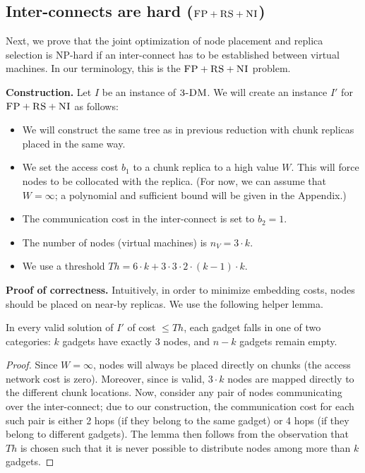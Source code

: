 \documentclass[9pt,twocolumn]{scrartcl}
\newcommand{\CC}{\textsc{NI}}
\newcommand{\FP}{\textsc{FP}}
\newcommand{\RS}{\textsc{RS}}
\newcommand{\CostTrans}{\ensuremath{b_1}}
\newcommand{\CostCom}{\ensuremath{b_2}}
\newcommand{\Vms}{\ensuremath{n_V}}
\newcommand{\TDM}{\textsc{3-DM}}
\newcommand{\Thr}{\ensuremath{Th}}
\begin{document}
\subsection{Inter-connects are hard ($\FP+\RS+\CC$)}\label{ssec:fprscc}

Next, we prove that the joint optimization of node placement and replica selection
is NP-hard if an inter-connect has to be established between virtual machines.
In our terminology, this is the $\FP+\RS+\CC$ problem.

\textbf{Construction.}
Let $I$ be an instance of $\TDM$. We will create an instance $I'$
for $\FP+\RS+\CC$ as follows:
\begin{itemize}
\item We will construct the same tree as in previous reduction with
chunk replicas placed in the same way.
\item We set the access cost $\CostTrans$ to a chunk replica to a high value $W$. This will force
nodes to be collocated with the replica.
(For now, we can assume that $W=\infty$; a polynomial and sufficient bound will be given
in the Appendix.)
\item The communication cost in the inter-connect is set to $\CostCom = 1$.
\item The number of nodes (virtual machines) is $\Vms = 3 \cdot k$.
\item We use a threshold $\Thr =  6 \cdot k + 3 \cdot 3 \cdot 2 \cdot
(k - 1) \cdot k$.
\end{itemize}


\textbf{Proof of correctness.}
Intuitively, in order to minimize embedding costs,
nodes should be placed on near-by replicas. We use the following
helper lemma.
\begin{lemma}\label{lemma:helper}
In every valid solution of $I'$ of cost $\leq \Thr$, each gadget
falls in one of two categories:
$k$ gadgets have exactly
$3$ nodes, and $n-k$ gadgets remain empty.
\end{lemma}
\begin{proof}
Since $W=\infty$, nodes will always be placed
directly on chunks (the access network cost is zero).
Moreover, since
is valid, $3 \cdot k$ nodes are mapped
directly to the different chunk locations.
Now, consider any pair of nodes communicating over the
inter-connect; due to our construction, the communication cost
for each such pair is either
2 hops (if they belong to the same gadget) or 4 hops (if they belong
to different gadgets).
The lemma then follows from the observation that $\Thr$
is chosen such that it is never possible to distribute nodes
among more than $k$ gadgets.
\end{proof}
\end{document}
